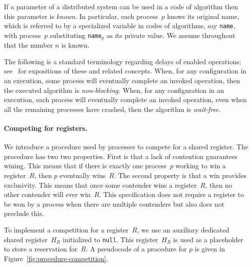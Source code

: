 \documentclass[11pt]{article}
\newcommand{\BBB}{\vspace*{-\bigskipamount}}
\newcommand{\Paragraph}[1]{\BBB\paragraph{#1}}
\begin{document}
If a parameter of a distributed system can be used in a code of algorithm then this parameter is \emph{known}.
In particular, each process~$p$ knows its original name, which is referred to by a specialized variable in codes of algorithms, say \texttt{name}, with process~$p$ substituting \texttt{name}$_p$ as its private value.
We assume throughout that the number $n$ is known.

The following is a standard terminology regarding delays of enabled operations; 
see~\cite{Attiya-Welch-book2004,HerlihyKozlovRajsbaum-book,Lynch-book96} for expositions of these and related concepts.
When, for any configuration in an execution, some process will eventually complete an invoked operation, then the executed algorithm is \emph{non-blocking.}
When, for any configuration in an execution, each process will eventually complete an invoked operation, even when all the remaining processes have crashed, then the algorithm is \emph{wait-free}.






\Paragraph{Competing for registers.}



We introduce a procedure used by processes to compete for a shared register.
The procedure  has two two properties.
First is that a lack of contention guarantees wining.
This means that if there is exactly one process~$p$ working to win a register~$R$, then $p$ eventually wins~$R$.
The second property is that a win provides exclusivity.
This means that once some contender wins a register~$R$, then no other contender will ever win~$R$.
This specification does not require a register to be won by a process when there are multiple contenders but also does not preclude this.

To implement a competition for a register~$R$, we use an auxiliary dedicated shared register~$H_R$ initialized to \texttt{null}.
This register~$H_R$ is used as a placeholder to store a reservation for~$R$.
A pseudocode of a procedure for $p$ is given in Figure~\ref{fig:procedure-competition}.
\end{document}
